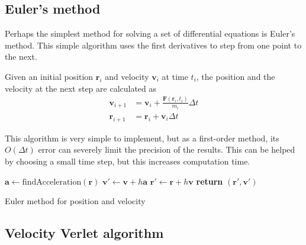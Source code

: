 \documentclass[aps,prc,reprint,nobalancelastpage]{revtex4-1}
\begin{document}
    \subsection{Euler's method}
    \label{sub:euler}

        Perhaps the simplest method for solving a set of differential equations is Euler's method. This simple algorithm uses the first derivatives to step from one point to the next.

        Given an initial position $\mathbf{r}_i$ and velocity $\mathbf{v}_i$ at time $t_i$, the position and the velocity at the next step are calculated as
        \begin{align}
            \mathbf{v}_{i+1} &= \mathbf{v}_i + \frac{\mathbf{F}(\mathbf{r}_i, t_i)}{m_i} \Delta t \\
            \mathbf{r}_{i+1} &= \mathbf{r}_i + \mathbf{v}_i \Delta t
        \end{align}

        This algorithm is very simple to implement, but as a first-order method, its $O(\Delta t)$ error can severely limit the precision of the results. This can be helped by choosing a small time step, but this increases computation time.

            \begin{algorithm}[H]
                \begin{algorithmic}
                        \State $\mathbf{a} \gets \text{findAcceleration}(\mathbf{r})$
                        \State $\mathbf{v}' \gets \mathbf{v} + h \mathbf{a}$
                        \State $\mathbf{r}' \gets \mathbf{r} + h \mathbf{v}$
                        \State \textbf{return} $(\mathbf{r}', \mathbf{v}')$
                    \EndFunction
                \end{algorithmic}
                \caption{Euler method for position and velocity}
            \end{algorithm}

    \subsection{Velocity Verlet algorithm}
    \label{sub:verlet}
\end{document}
